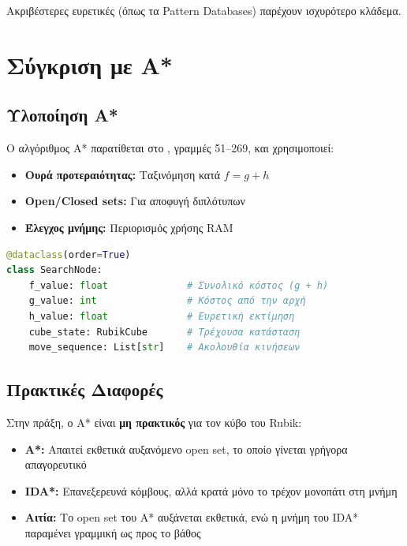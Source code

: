 Ακριβέστερες ευρετικές (όπως τα Pattern Databases) παρέχουν ισχυρότερο κλάδεμα.

\section{Σύγκριση με A*}

\subsection{Υλοποίηση A*}

Ο αλγόριθμος A* παρατίθεται στο
, γραμμές 51--269, και χρησιμοποιεί:

\begin{itemize}
    \item \textbf{Ουρά προτεραιότητας:} Ταξινόμηση κατά $f = g + h$
    \item \textbf{Open/Closed sets:} Για αποφυγή διπλότυπων
    \item \textbf{Έλεγχος μνήμης:} Περιορισμός χρήσης RAM
\end{itemize}

\begin{lstlisting}[language=Python, caption={Δομή κόμβου A*}]
@dataclass(order=True)
class SearchNode:
    f_value: float              # Συνολικό κόστος (g + h)
    g_value: int                # Κόστος από την αρχή
    h_value: float              # Ευρετική εκτίμηση
    cube_state: RubikCube       # Τρέχουσα κατάσταση
    move_sequence: List[str]    # Ακολουθία κινήσεων
\end{lstlisting}

\subsection{Πρακτικές Διαφορές}

Στην πράξη, ο A* είναι \textbf{μη πρακτικός} για τον κύβο του Rubik:

\begin{itemize}
    \item \textbf{A*:} Απαιτεί εκθετικά αυξανόμενο open set, το οποίο γίνεται γρήγορα απαγορευτικό
    \item \textbf{IDA*:} Επανεξερευνά κόμβους, αλλά κρατά μόνο το τρέχον μονοπάτι στη μνήμη
    \item \textbf{Αιτία:} Το open set του A* αυξάνεται εκθετικά, ενώ η μνήμη του IDA* παραμένει γραμμική ως προς το βάθος
\end{itemize}

